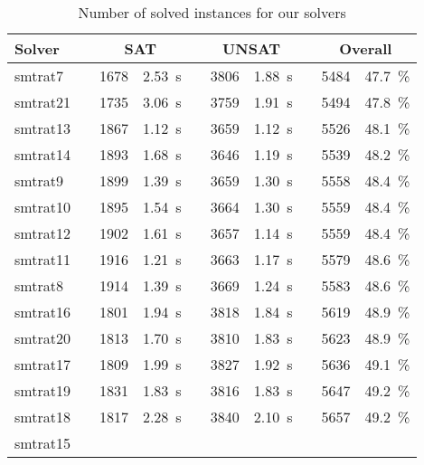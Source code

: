 \begin{table}[]
    \caption{Number of solved instances for our solvers}
    \centering
    \begin{tabularx}{\textwidth}{lXrrXrrXrr}
    	\toprule
    	\textbf{Solver}
    	&& \multicolumn{2}{c}{\textbf{SAT}}
    	&& \multicolumn{2}{c}{\textbf{UNSAT}}
    	&& \multicolumn{2}{c}{\textbf{Overall}}
    	\\
    	\midrule
    	\rowcolor{black!20}
    	smtrat7
    	&& 1678 & 2.53~s
    	&& 3806 & 1.88~s
    	&& 5484 & 47.7~\%
    	\\ 
    	\rowcolor{black!20}
    	smtrat21
    	&& 1735 & 3.06~s
    	&& 3759 & 1.91~s
    	&& 5494 & 47.8~\%
    	\\
    	\rowcolor{red!20}
    	smtrat13
    	&& 1867 & 1.12~s
    	&& 3659 & 1.12~s
    	&& 5526 & 48.1~\%
    	\\
    	\rowcolor{red!20}
    	smtrat14
    	&& 1893 & 1.68~s
    	&& 3646 & 1.19~s
    	&& 5539 & 48.2~\%
    	\\
    	\rowcolor{red!20}
    	smtrat9
    	&& 1899 & 1.39~s
    	&& 3659 & 1.30~s
    	&& 5558 & 48.4~\%
    	\\
    	\rowcolor{red!20}
    	smtrat10
    	&& 1895 & 1.54~s
    	&& 3664 & 1.30~s
    	&& 5559 & 48.4~\%
    	\\
    	\rowcolor{red!20}
    	smtrat12
    	&& 1902 & 1.61~s
    	&& 3657 & 1.14~s
    	&& 5559 & 48.4~\%
    	\\
    	\rowcolor{red!20}
    	smtrat11
    	&& 1916 & 1.21~s
    	&& 3663 & 1.17~s
    	&& 5579 & 48.6~\%
    	\\
    	\rowcolor{red!20}
    	smtrat8
    	&& 1914 & 1.39~s
    	&& 3669 & 1.24~s
    	&& 5583 & 48.6~\%
    	\\
    	\rowcolor{blue!20}
    	smtrat16
    	&& 1801 & 1.94~s
    	&& 3818 & 1.84~s
    	&& 5619 & 48.9~\%
    	\\
    	\rowcolor{blue!20}
    	smtrat20
    	&& 1813 & 1.70~s
    	&& 3810 & 1.83~s
    	&& 5623 & 48.9~\%
    	\\
    	\rowcolor{blue!20}
    	smtrat17
    	&& 1809 & 1.99~s
    	&& 3827 & 1.92~s
    	&& 5636 & 49.1~\%
    	\\
    	\rowcolor{blue!20}
    	smtrat19
    	&& 1831 & 1.83~s
    	&& 3816 & 1.83~s
    	&& 5647 & 49.2~\%
    	\\
    	\rowcolor{blue!20}
    	smtrat18
    	&& 1817 & 2.28~s
    	&& 3840 & 2.10~s
    	&& 5657 & 49.2~\%
    	\\
    	\rowcolor{blue!20}
    	smtrat15

\end{tabularx}
\end{table}
